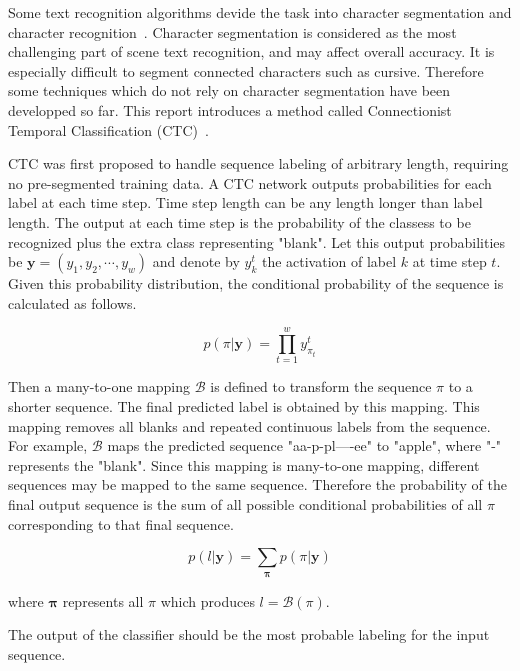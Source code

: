 Some text recognition algorithms devide the task into character segmentation and character recognition~\cite{bissacco2013photoocr}\cite{phan2011gradient}.
Character segmentation is considered as the most challenging part of scene text recognition, and may affect
overall accuracy. It is especially difficult to segment connected characters such as cursive.
Therefore some techniques which do not rely on character segmentation have been developped so far.
This report introduces a method called Connectionist Temporal Classification (CTC)~\cite{graves2006connectionist}.

CTC was first proposed to handle sequence labeling of arbitrary length,
requiring no pre-segmented training data. A CTC network outputs probabilities for each label
at each time step. Time step length can be any length longer than label length.
The output at each time step is the probability of the classess to be recognized plus
the extra class representing "blank". Let this output probabilities be
$\mathbf{y}=(y_1, y_2, \cdots, y_w)$ and denote by $y_{k}^{t}$ the activation of
label $k$ at time step $t$. Given this probability distribution, the conditional
probability of the sequence is calculated as follows.

\begin{equation}
    p(\pi |\mathbf{y}) = \prod_{t=1}^{w}y_{\pi_t}^{t}
\end{equation}

Then a many-to-one mapping $\mathcal{B}$ is defined to transform the sequence
$\pi$ to a shorter sequence. The final predicted label is obtained by this mapping.
This mapping removes all blanks and repeated continuous labels from the sequence.
For example, $\mathcal{B}$ maps the predicted sequence "aa-p-pl----ee" to "apple",
where "-" represents the "blank". Since this mapping is many-to-one mapping, different
sequences may be mapped to the same sequence. Therefore the probability of the final
output sequence is the sum of all possible conditional probabilities of all $\pi$ corresponding
to that final sequence.

\begin{equation}
    p(l|\mathbf{y}) = \sum_{\mathbf{\pi}} p(\pi | \mathbf{y})
\end{equation}

where $\mathbf{\pi}$ represents all $\pi$ which produces $l = \mathcal{B}(\pi)$.

The output of the classifier should be the most probable labeling for the input sequence.

